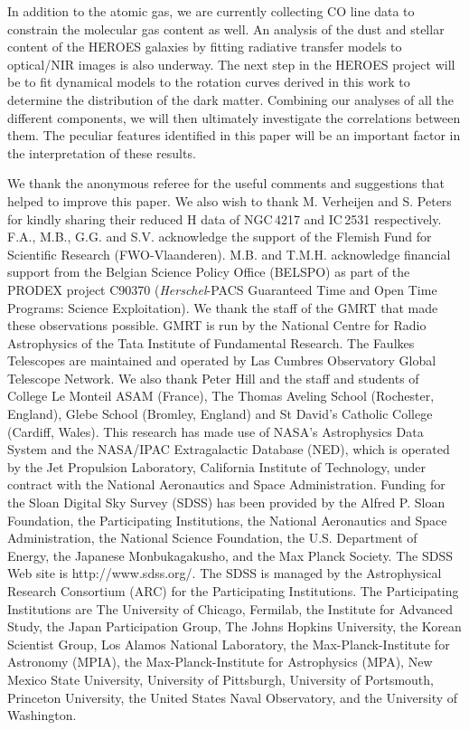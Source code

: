 \documentclass{aa}
\begin{document}
In addition to the atomic gas, we are currently collecting CO line data to constrain the molecular gas content as well. An analysis of the dust and stellar content of the HEROES galaxies by fitting radiative transfer models to optical/NIR images is also underway. The next step in the HEROES project will be to fit dynamical models to the rotation curves derived in this work to determine the distribution of the dark matter. Combining our analyses of all the different components, we will then ultimately investigate the correlations between them. The peculiar features identified in this paper will be an important factor in the interpretation of these results.


\begin{acknowledgements}

We thank the anonymous referee for the useful comments and suggestions that helped to improve this paper. We also wish to thank M. Verheijen and S. Peters for kindly sharing their reduced H{} data of NGC\,4217 and IC\,2531 respectively. F.A., M.B., G.G. and S.V. acknowledge the support of the Flemish Fund for Scientific Research (FWO-Vlaanderen). M.B. and T.M.H. acknowledge financial support from the Belgian Science Policy Office (BELSPO) as part of the PRODEX project C90370 (\textit{Herschel}-PACS Guaranteed Time and Open Time Programs: Science Exploitation). We thank the staff of the GMRT that made these observations possible. GMRT is run by the National Centre for Radio Astrophysics of the Tata Institute of Fundamental Research. The Faulkes Telescopes are maintained and operated by Las Cumbres Observatory Global Telescope Network. We also thank Peter Hill and the staff and students of College Le Monteil ASAM (France), The Thomas Aveling School (Rochester, England), Glebe School (Bromley, England) and St David's Catholic College (Cardiff, Wales). This research has made use of NASA's Astrophysics Data System and the NASA/IPAC Extragalactic Database (NED), which is operated by the Jet Propulsion Laboratory, California Institute of Technology, under contract with the National Aeronautics and Space Administration. Funding for the Sloan Digital Sky Survey (SDSS) has been provided by the Alfred P. Sloan Foundation, the Participating Institutions, the National Aeronautics and Space Administration, the National Science Foundation, the U.S. Department of Energy, the Japanese Monbukagakusho, and the Max Planck Society. The SDSS Web site is http://www.sdss.org/. The SDSS is managed by the Astrophysical Research Consortium (ARC) for the Participating Institutions. The Participating Institutions are The University of Chicago, Fermilab, the Institute for Advanced Study, the Japan Participation Group, The Johns Hopkins University, the Korean Scientist Group, Los Alamos National Laboratory, the Max-Planck-Institute for Astronomy (MPIA), the Max-Planck-Institute for Astrophysics (MPA), New Mexico State University, University of Pittsburgh, University of Portsmouth, Princeton University, the United States Naval Observatory, and the University of Washington.

\end{acknowledgements}
\end{document}
